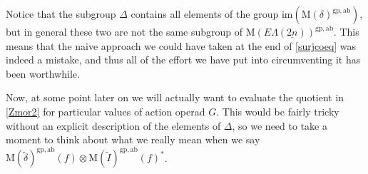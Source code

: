 \documentclass{amsbook} %
\newcommand{\ELnn}{E\Lambda(\underline{2n})}
\numberwithin{section}{chapter}
\begin{document}
Notice that the subgroup $\Delta$ contains all elements of the group $\mathrm{im}(\mathrm{M}(\delta)^{\mathrm{gp, ab}})$, but in general these two are not the same subgroup of $\mathrm{M}(\ELnn)^{\mathrm{gp, ab}}$. This means that the naive approach we could have taken at the end of \cref{surjcoeq} was indeed a mistake, and thus all of the effort we have put into circumventing it has been worthwhile.  

Now, at some point later on we will actually want to evaluate the quotient in \cref{Zmor2} for particular values of action operad $G$. This would be fairly tricky without an explicit description of the elements of $\Delta$, so we need to take a moment to think about what we really mean when we say $\mathrm{M}(\tilde{\delta})^{\mathrm{gp, ab}}(f) \otimes \mathrm{M}(\tilde{I})^{\mathrm{gp, ab}}(f)^*$.
\end{document}
